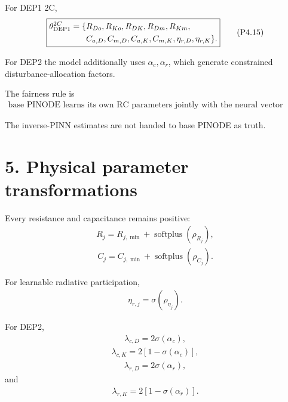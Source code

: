 \documentclass[11pt]{article}
\begin{document}
For DEP1 2C,
\begin{align}
\boxed{
\begin{aligned}
\theta_{\rm DEP1}^{2C}
=
\{&
R_{Do},R_{Ko},R_{DK},
R_{Dm},R_{Km},\\
&
C_{a,D},C_{m,D},
C_{a,K},C_{m,K},
\eta_{r,D},\eta_{r,K}
\}.
\end{aligned}
}
\tag{P4.15}
\end{align}

For DEP2 the model additionally uses \(\alpha_c,\alpha_r\), which generate constrained disturbance-allocation factors.

The fairness rule is
\begin{align}
\boxed{\text{base PINODE learns its own RC parameters jointly with the neural vector field.}}
\tag{P4.16}
\end{align}

The inverse-PINN estimates are not handed to base PINODE as truth.

\section*{5. Physical parameter transformations}

Every resistance and capacitance remains positive:
\begin{align}
\boxed{
R_j=R_{j,\min}+\operatorname{softplus}(\rho_{R_j}),
}
\tag{P4.17}
\end{align}
\begin{align}
\boxed{
C_j=C_{j,\min}+\operatorname{softplus}(\rho_{C_j}).
}
\tag{P4.18}
\end{align}

For learnable radiative participation,
\begin{align}
\boxed{\eta_{r,j}=\sigma(\rho_{\eta_j}).}
\tag{P4.19}
\end{align}

For DEP2,
\begin{align}
\boxed{\lambda_{c,D}=2\sigma(\alpha_c),}
\tag{P4.20}
\end{align}
\begin{align}
\boxed{\lambda_{c,K}=2[1-\sigma(\alpha_c)],}
\tag{P4.21}
\end{align}
\begin{align}
\boxed{\lambda_{r,D}=2\sigma(\alpha_r),}
\tag{P4.22}
\end{align}
and
\begin{align}
\boxed{\lambda_{r,K}=2[1-\sigma(\alpha_r)].}
\tag{P4.23}
\end{align}
\end{document}
